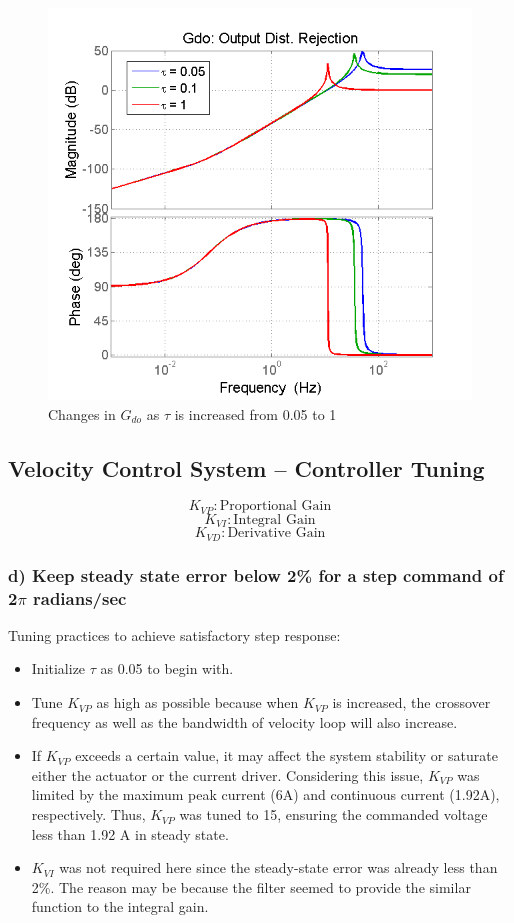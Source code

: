 \documentclass{article}
\theoremstyle{plain}
\theoremstyle{definition}
\theoremstyle{remark}
\begin{document}
\begin{figure}[htb]
\begin{center}
\includegraphics[width = 10 cm]{q3_10}
\caption{Changes in $G_{do}$  as $\tau$ is increased from 0.05 to 1}
\label{q3_10}
\end{center}
\end{figure}

\clearpage

\subsection*{Velocity Control System – Controller Tuning}
$$K_{VP} : \text{Proportional Gain}$$
$$K_{VI} : \text{Integral Gain}$$
$$K_{VD} : \text{Derivative Gain}$$

\subsubsection*{d) Keep steady state error below 2\% for a step command of 2$\pi$ radians/sec}
Tuning practices to achieve satisfactory step response:
\begin{itemize}
\item Initialize $\tau$ as 0.05 to begin with.
\item Tune $K_{VP}$ as high as possible because when $K_{VP}$ is increased, the crossover frequency as well as the bandwidth of velocity loop will also increase.
\item If $K_{VP}$ exceeds a certain value, it may affect the system stability or saturate either the actuator or the current driver. Considering this issue, $K_{VP}$ was limited by the maximum peak current (6A) and continuous current (1.92A), respectively. Thus, $K_{VP}$  was tuned to 15, ensuring the commanded voltage less than 1.92 A in steady state.  
\item $K_{VI}$ was not required here since the steady-state error was already less than 2\%. The reason may be because the filter seemed to provide the similar function to the integral gain.
\end{itemize}
\end{document}
